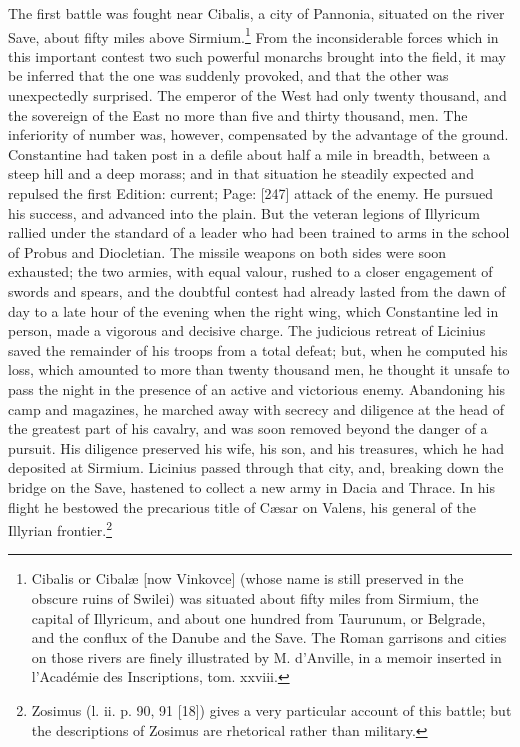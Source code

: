 The first battle was fought near Cibalis, a city of Pannonia, situated on the river Save, about fifty miles above Sirmium.\footnote{Cibalis or Cibalæ [now Vinkovce] (whose name is still preserved in the obscure ruins of Swilei) was situated about fifty miles from Sirmium, the capital of Illyricum, and about one hundred from Taurunum, or Belgrade, and the conflux of the Danube and the Save. The Roman garrisons and cities on those rivers are finely illustrated by M. d\texthebrew{}’Anville, in a memoir inserted in l\texthebrew{}’Académie des Inscriptions, tom. xxviii.} From the inconsiderable forces which in this important contest two such powerful monarchs brought into the field, it may be inferred that the one was suddenly provoked, and that the other was unexpectedly surprised. The emperor of the West had only twenty thousand, and the sovereign of the East no more than five and thirty thousand, men. The inferiority of number was, however, compensated by the advantage of the ground. Constantine had taken post in a defile about half a mile in breadth, between a steep hill and a deep morass; and in that situation he steadily expected and repulsed the first Edition: current; Page: [247] attack of the enemy. He pursued his success, and advanced into the plain. But the veteran legions of Illyricum rallied under the standard of a leader who had been trained to arms in the school of Probus and Diocletian. The missile weapons on both sides were soon exhausted; the two armies, with equal valour, rushed to a closer engagement of swords and spears, and the doubtful contest had already lasted from the dawn of day to a late hour of the evening when the right wing, which Constantine led in person, made a vigorous and decisive charge. The judicious retreat of Licinius saved the remainder of his troops from a total defeat; but, when he computed his loss, which amounted to more than twenty thousand men, he thought it unsafe to pass the night in the presence of an active and victorious enemy. Abandoning his camp and magazines, he marched away with secrecy and diligence at the head of the greatest part of his cavalry, and was soon removed beyond the danger of a pursuit. His diligence preserved his wife, his son, and his treasures, which he had deposited at Sirmium. Licinius passed through that city, and, breaking down the bridge on the Save, hastened to collect a new army in Dacia and Thrace. In his flight he bestowed the precarious title of Cæsar on Valens, his general of the Illyrian frontier.\footnote{Zosimus (l. ii. p. 90, 91 [18]) gives a very particular account of this battle; but the descriptions of Zosimus are rhetorical rather than military.}

